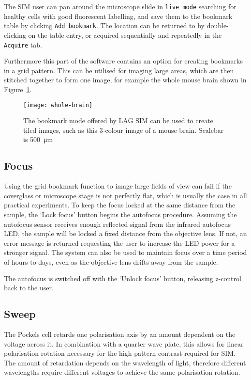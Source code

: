 The SIM user can pan around the microscope slide in \texttt{live mode} searching for healthy cells with good fluorescent labelling, and save them to the bookmark table by clicking \texttt{Add bookmark}. 
The location can be returned to by double-clicking on the table entry, or acquired sequentially and repeatedly in the \texttt{Acquire} tab. 

Furthermore this part of the software contains an option for creating bookmarks in a grid pattern. 
This can be utilised for imaging large areas, which are then stitched together to form one image, for example the whole mouse brain shown in Figure~\ref{fig:wholebrain}. 

\begin{figure}[p]
\centering
\texttt{[image: whole-brain]}
\caption[LAG SIM: An image of a full mouse brain can be captured as a mosaic of images]{The bookmark mode offered by LAG SIM can be used to create tiled images, such as this 3-colour image of a mouse brain. Scalebar is \SI{500}{\micro\metre}}
\label{fig:wholebrain}
\end{figure}

\subsection{Focus} \label{sec:lagsimFocus}
Using the grid bookmark function to image large fields of view can fail if the coverglass or microscope stage is not perfectly flat, which is usually the case in all practical experiments. 
To keep the focus locked at the same distance from the sample, the `Lock focus' button begins the autofocus procedure. 
Assuming the autofocus sensor receives enough reflected signal from the infrared autofocus LED, the sample will be locked a fixed distance from the objective lens. 
If not, an error message is returned requesting the user to increase the LED power for a stronger signal. 
The system can also be used to maintain focus over a time period of hours to days, even as the objective lens drifts away from the sample. 

The autofocus is switched off with the `Unlock focus' button, releasing z-control back to the user. 

\subsection{Sweep} 
The Pockels cell retards one polarisation axis by an amount dependent on the voltage across it. 
In combination with a quarter wave plate, this allows for linear polarisation rotation necessary for the high pattern contrast required for SIM. 
The amount of retardation depends on the wavelength of light, therefore different wavelengths require different voltages to achieve the same polarisation rotation. 

